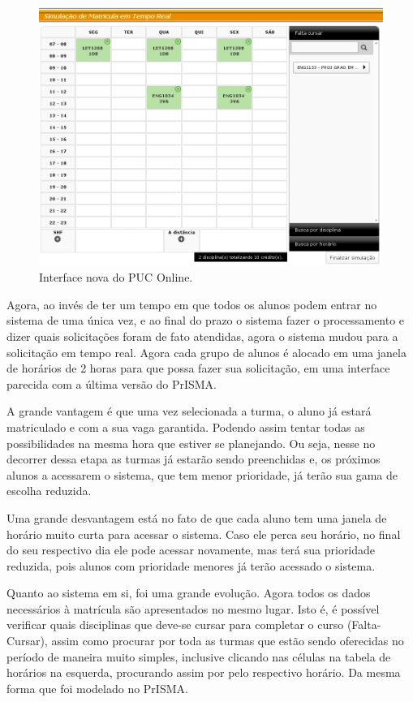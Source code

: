 \documentclass[graduacao,brazil]{ThesisPUC}
\begin{document}
\begin{figure}[H]
    \centering
    \includegraphics[width=\linewidth]{img/puc_online_novo.png}
    \caption{Interface nova do PUC Online.}
\end{figure}

Agora, ao invés de ter um tempo em que todos os alunos podem entrar no sistema de uma única vez, e ao final do prazo o sistema fazer o processamento e dizer quais solicitações foram de fato atendidas, agora o sistema mudou para a solicitação em tempo real. Agora cada grupo de alunos é alocado em uma janela de horários de 2 horas para que possa fazer sua solicitação, em uma interface parecida com a última versão do PrISMA.

A grande vantagem é que uma vez selecionada a turma, o aluno já estará matriculado e com a sua vaga garantida. Podendo assim tentar todas as possibilidades na mesma hora que estiver se planejando. Ou seja, nesse no decorrer dessa etapa as turmas já estarão sendo preenchidas e, os próximos alunos a acessarem o sistema, que tem menor prioridade, já terão sua gama de escolha reduzida.

Uma grande desvantagem está no fato de que cada aluno tem uma janela de horário muito curta para acessar o sistema. Caso ele perca seu horário, no final do seu respectivo dia ele pode acessar novamente, mas terá sua prioridade reduzida, pois alunos com prioridade menores já terão acessado o sistema.

Quanto ao sistema em si, foi uma grande evolução. Agora todos os dados necessários à matrícula são apresentados no mesmo lugar. Isto é, é possível verificar quais disciplinas que deve-se cursar para completar o curso (Falta-Cursar), assim como procurar por toda as turmas que estão sendo oferecidas no período de maneira muito simples, inclusive clicando nas células na tabela de horários na esquerda, procurando assim por pelo respectivo horário. Da mesma forma que foi modelado no PrISMA.
\end{document}
